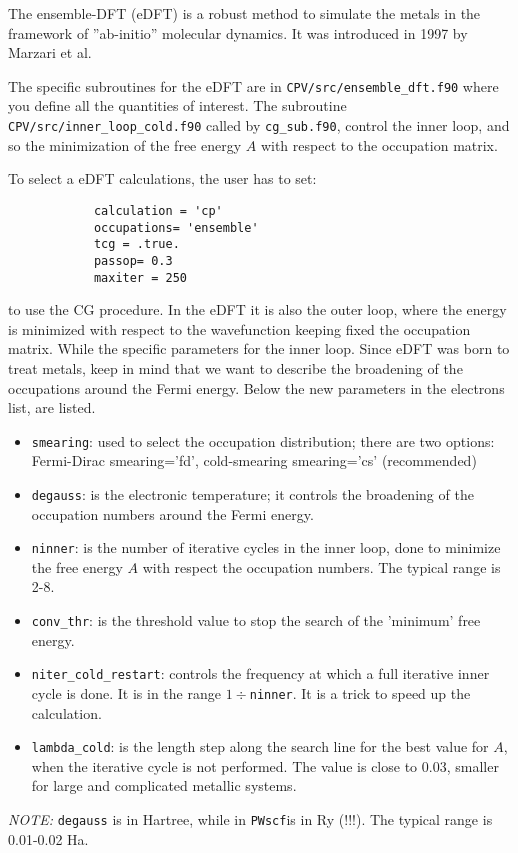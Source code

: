 \documentclass[12pt,a4paper]{article}
\def\PWscf{\texttt{PWscf}}
\begin{document}
The ensemble-DFT (eDFT) is a robust method to simulate the metals in the 
framework of ''ab-initio'' molecular dynamics. It was introduced in 1997 
by Marzari et al.

The specific subroutines for the eDFT are in 
\texttt{CPV/src/ensemble\_dft.f90} where you 
define all the quantities of interest. The subroutine 
\texttt{CPV/src/inner\_loop\_cold.f90}
called by \texttt{cg\_sub.f90}, control the inner loop, and so the minimization of 
the free energy $A$ with respect to the occupation matrix.

To select a eDFT calculations, the user has to set:
\begin{verbatim}
            calculation = 'cp'
            occupations= 'ensemble' 
            tcg = .true.
            passop= 0.3
            maxiter = 250
\end{verbatim}
to use the CG procedure. In the eDFT it is also the outer loop, where the
energy is minimized with respect to the wavefunction keeping fixed the 
occupation matrix. While the specific parameters for the inner loop.
Since eDFT was born to treat metals, keep in mind that we want to describe 
the broadening of the occupations around the Fermi energy.
Below the new parameters in the electrons list, are listed.
\begin{itemize}
\item \texttt{smearing}: used to select the occupation distribution;
there are two options: Fermi-Dirac smearing='fd', cold-smearing
smearing='cs' (recommended) 
\item \texttt{degauss}: is the electronic temperature; it controls the broadening
of the occupation numbers around the Fermi energy. 
\item \texttt{ninner}: is the number of iterative cycles in the inner loop, 
done to minimize the free energy $A$ with respect the occupation numbers.
The typical range is 2-8.
\item \texttt{conv\_thr}: is the threshold value to stop the search of the 'minimum' 
free energy.
\item \texttt{niter\_cold\_restart}: controls the frequency at which a full iterative
inner cycle is done. It is in the range $1\div$\texttt{ninner}. It is a trick to speed up 
the calculation.
\item \texttt{lambda\_cold}: is the length step along the search line for the best 
value for $A$, when the iterative cycle is not performed. The value is close 
to 0.03, smaller for large and complicated metallic systems.
\end{itemize}
{\em NOTE:} \texttt{degauss} is in Hartree, while in \PWscf is in Ry (!!!). 
The typical range is 0.01-0.02 Ha.
\end{document}
